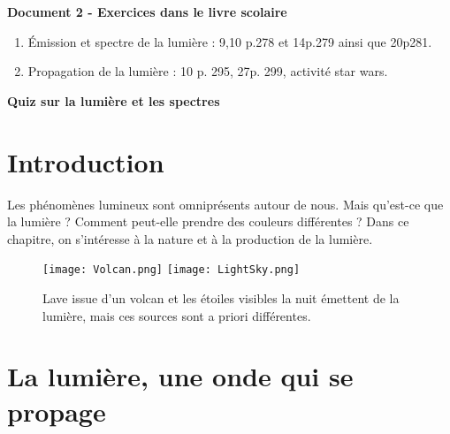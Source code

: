 \documentclass[french, a4paper, 12pt]{article}
\newcommand{\doc}[3]{
	\begin{mdframed}[style=doc, leftmargin=0pt, rightmargin=0pt, innertopmargin=8pt, innerbottommargin=8pt, innerrightmargin=10pt, innerleftmargin=10pt]

		\noindent \textbf{Document #1 - #2}\medskip

		#3
	\end{mdframed}
}
\begin{document}



\doc{2}{Exercices dans le livre scolaire}{
		\begin{enumerate}
			\item Émission et spectre de la lumière : 9,10 p.278 et 14p.279 ainsi que 20p281.
			\item Propagation de la lumière : 10 p. 295, 27p. 299, activité star wars.
		\end{enumerate}
}
	\noindent \textbf{Quiz sur la lumière et les spectres}
\begin{figure}[ht]
	\centering
	\hfill
	\hfill
	\hfill
	\hfill

\end{figure}

\clearpage
\section*{Introduction}

Les phénomènes lumineux sont omniprésents autour de nous. Mais qu’est-ce que
la lumière ? Comment peut-elle prendre des couleurs différentes ? Dans ce chapitre,
on s’intéresse à la nature et à la production de la lumière.

\begin{figure}[ht]
	\centering
	\texttt{[image: Volcan.png]}\hspace{1cm}
	\texttt{[image: LightSky.png]}
	\caption{Lave issue d'un volcan et les étoiles visibles la nuit émettent de la lumière, mais ces sources sont a priori différentes.}
\end{figure}
\vspace{-1cm}
\section{La lumière, une onde qui se propage}
\end{document}
